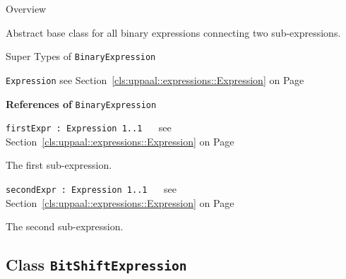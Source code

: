 	\begin{longdescription}
		\item[Overview] 		
				

	

		Abstract base class for all binary expressions connecting two sub-expressions.		
		\item[Super Types of \texttt{BinaryExpression}] ~
			\begin{longdescription}
				\item[\texttt{Expression}] see Section~\ref{cls:uppaal::expressions::Expression} on Page~\pageref{cls:uppaal::expressions::Expression}						\end{longdescription}
		
	
			\item[\textbf{References of} \texttt{BinaryExpression}] ~
			\begin{longdescription}
	\item[\texttt{firstExpr : Expression 	\symbol{"5B}1..1\symbol{"5D}
}] ~
	see Section~\ref{cls:uppaal::expressions::Expression} on Page~\pageref{cls:uppaal::expressions::Expression}
	
	\nopagebreak
		
				

	

		The first sub-expression.		
	\item[\texttt{secondExpr : Expression 	\symbol{"5B}1..1\symbol{"5D}
}] ~
	see Section~\ref{cls:uppaal::expressions::Expression} on Page~\pageref{cls:uppaal::expressions::Expression}
	
	\nopagebreak
		
				

	

		The second sub-expression.		
			\end{longdescription}
	
	\end{longdescription}
	

\subsection{Class \bfseries \texttt{BitShiftExpression}\normalfont}
\label{cls:uppaal::expressions::BitShiftExpression} 
	

